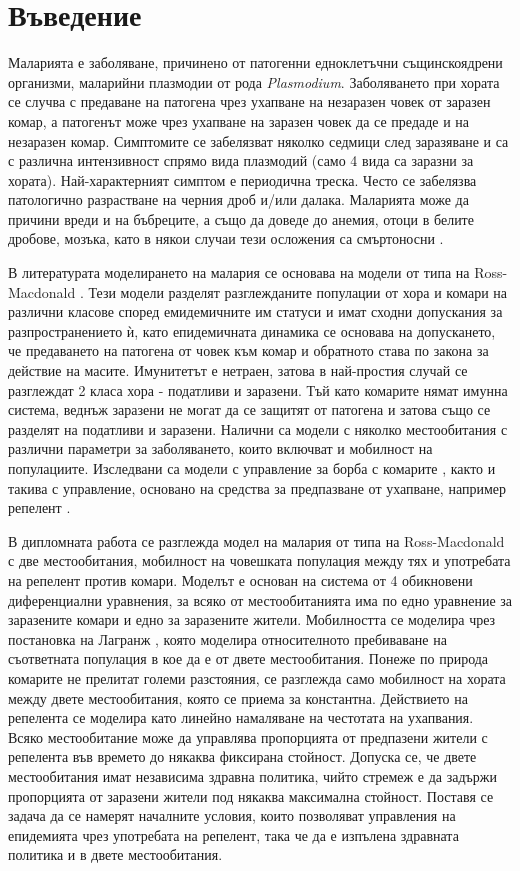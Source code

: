 \section{Въведение}
Маларията е заболяване, причинено от патогенни едноклетъчни същинскоядрени организми, маларийни плазмодии от рода \textit{Plasmodium}.
Заболяването при хората се случва с предаване на патогена чрез ухапване на незаразен човек от заразен комар, а патогенът може чрез ухапване на заразен човек да се предаде и на незаразен комар.
Симптомите се забелязват няколко седмици след заразяване и са с различна интензивност спрямо вида плазмодий (само 4 вида са заразни за хората).
Най-характерният симптом е периодична треска. Често се забелязва патологично разрастване на черния дроб и/или далака.
Маларията може да причини вреди и на бъбреците, а също да доведе до анемия, отоци в белите дробове, мозъка, като в някои случаи тези осложения са смъртоносни \cite[глава~83]{Baron1996}.

В литературата моделирането на малария се основава на модели от типа на Ross-Macdonald \cite{Smith2012}.
Тези модели разделят разглежданите популации от хора и комари на различни класове според емидемичните им статуси и имат сходни допускания за разпространението ѝ, като епидемичната динамика се основава на допускането, че предаването на патогена от човек към комар и обратното става по закона за действие на масите.
Имунитетът е нетраен, затова в най-простия случай се разглеждат 2 класа хора - податливи и заразени.
Тъй като комарите нямат имунна система, веднъж заразени не могат да се защитят от патогена и затова също се разделят на податливи и заразени.
Налични са модели \cite{Cosner2009, Ruktanonchai2016, Bichara2016, Agusto2021, Prosper2012} с няколко местообитания с различни параметри за заболяването, които включват и мобилност на популациите.
Изследвани са модели с управление за борба с комарите \cite{DeLara2016}, както и такива с управление, основано на средства за предпазване от ухапване, например репелент \cite{Rashkov2022, Rashkov2021}.

В дипломната работа се разглежда модел на малария от типа на Ross-Macdonald с две местообитания, мобилност на човешката популация между тях и употребата на репелент против комари.
Моделът е основан на система от 4 обикновени диференциални уравнения, за всяко от местообитанията има по едно уравнение за заразените комари и едно за заразените жители.
Мобилността се моделира чрез постановка на Лагранж \cite{Cosner2009}, която моделира относителното пребиваване на съответната популация в кое да е от двете местообитания.
Понеже по природа комарите не прелитат големи разстояния, се разглежда само мобилност на хората между двете местообитания, която се приема за константна.
Действието на репелента се моделира като линейно намаляване на честотата на ухапвания.
Всяко местообитание може да управлява пропорцията от предпазени жители с репелента във времето до някаква фиксирана стойност.
Допуска се, че двете местообитания имат независима здравна политика, чийто стремеж е да задържи пропорцията от заразени жители под някаква максимална стойност.
Поставя се задача да се намерят началните условия, които позволяват управления на епидемията чрез употребата на репелент, така че да е изпълена здравната политика и в двете местообитания.
